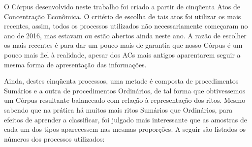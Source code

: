 \documentclass[11pt]{report}
\begin{document}
O Córpus desenvolvido neste trabalho foi criado a partir de cinqüenta Atos de Concentração Econômica. O critério de escolha de tais atos foi utilizar os mais recentes, assim,
todos os processos utilizados não necessariamente começaram no ano de 2016, mas estavam ou estão abertos ainda neste ano. A razão de escolher os mais recentes é para dar um pouco
mais de garantia que nosso Córpus é um pouco mais fiel à realidade, apesar dos ACs mais antigos aparentarem seguir a mesma forma de apresentação das informações.

Ainda, destes cinqüenta processos, uma metade é composta de procedimentos Sumários e a outra de procedimentos Ordinários, de tal forma que obtivessemos um Córpus resultante balanceado
com relação à representação dos ritos. Mesmo sabendo que na prática há muitos mais ritos Sumários que Ordinários, para efeitos de aprender a classificar, foi julgado mais
interessante que as amostras de cada um dos tipos aparecessem nas mesmas proporções. A seguir são listados os números dos processos utilizados:
\end{document}
